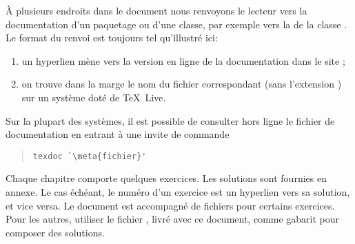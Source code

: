 À plusieurs endroits dans le document nous renvoyons le lecteur vers
la documentation d'un paquetage ou d'une classe, par exemple vers la %
de la classe . Le format du renvoi est toujours tel
qu'illustré ici:
\begin{enumerate}
\item un hyperlien mène vers la version en ligne de la documentation
  dans le site %
  ;
\item on trouve dans la marge le nom du fichier correspondant (sans
  l'extension ) sur un système doté de {\TeX}~Live.
\end{enumerate}
Sur la plupart des systèmes, il est possible de consulter hors ligne
le fichier de documentation  en entrant à une
invite de commande
\begin{quote}
\begin{lstlisting}[backgroundcolor=\color{white}]
texdoc `\meta{fichier}'
\end{lstlisting}
\end{quote}


Chaque chapitre comporte quelques exercices. Les solutions sont
fournies en annexe. Le cas échéant, le numéro d'un exercice est un
hyperlien vers sa solution, et vice versa. Le document est accompagné
de fichiers pour certains exercices. Pour les autres, utiliser le
fichier , livré avec ce document, comme
gabarit pour composer des solutions.

